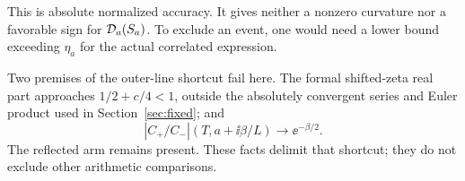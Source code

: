 This is absolute normalized accuracy. It gives neither a nonzero
curvature nor a favorable sign for \(\mathcal D_a(S_a)\). To exclude an event,
one would need a lower bound exceeding \(\eta_a\) for the actual
correlated expression.

Two premises of the outer-line shortcut fail here. The formal
shifted-zeta real part approaches \(1/2+c/4<1\), outside the absolutely
convergent series and Euler product used in Section~\ref{sec:fixed};
and
\[
 |C_+/C_-|(T,a+\ii\beta/L)\longrightarrow\ee^{-\beta/2}.
\]
The reflected arm remains present. These facts delimit that shortcut;
they do not exclude other arithmetic comparisons.
